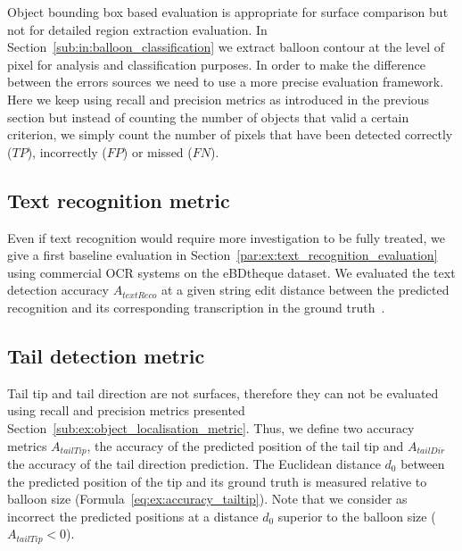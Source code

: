 Object bounding box based evaluation is appropriate for surface comparison but not for detailed region extraction evaluation.
In Section~\ref{sub:in:balloon_classification} we extract balloon contour at the level of pixel for analysis and classification purposes.
In order to make the difference between the errors sources we need to use a more precise evaluation framework.
Here we keep using recall and precision metrics as introduced in the previous section but instead of counting the number of objects that valid a certain criterion, we simply count the number of pixels that have been detected correctly ($TP$), incorrectly ($FP$) or missed ($FN$).


\subsection{Text recognition metric} %
\label{sub:ex:text_recognition_metric}
Even if text recognition would require more investigation to be fully treated, we give a first baseline evaluation in Section~\ref{par:ex:text_recognition_evaluation} using commercial OCR systems on the eBDtheque dataset.
We evaluated the text detection accuracy $A_{textReco}$ at a given string edit distance between the predicted recognition and its corresponding transcription in the ground truth~\cite{Guerin2013}.


\subsection{Tail detection metric} %
\label{sub:ex:tail_detection_metric}

Tail tip and tail direction are not surfaces, therefore they can not be evaluated using recall and precision metrics presented Section~\ref{sub:ex:object_localisation_metric}.
Thus, we define two accuracy metrics $A_{tailTip}$, the accuracy of the predicted position of the tail tip and $A_{tailDir}$ the accuracy of the tail direction prediction.
The Euclidean distance $d_0$ between the predicted position of the tip and its ground truth is measured relative to balloon size (Formula~\ref{eq:ex:accuracy_tailtip}).
Note that we consider as incorrect the predicted positions at a distance $d_0$ superior to the balloon size ($A_{tailTip} < 0$). 

